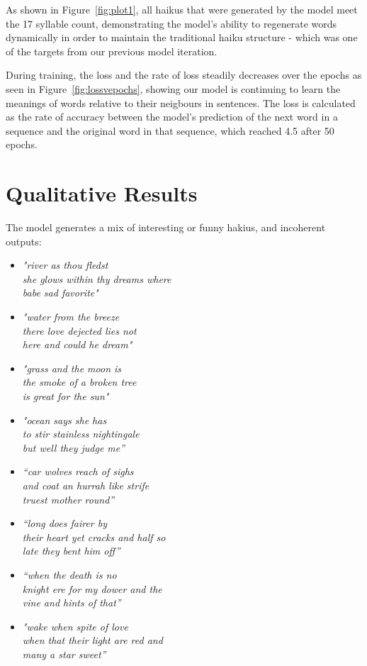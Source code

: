 \documentclass{article} %
\begin{document}
As shown in Figure~\ref{fig:plot1}, all haikus that were generated by the model meet the 17 syllable count, 
demonstrating the model’s ability to regenerate words dynamically in order to maintain the traditional haiku structure - which was one of the targets from our previous model iteration.

During training, the loss and the rate of loss steadily decreases over the epochs as seen in Figure~\ref{fig:lossvepochs}, showing our model is continuing to learn the meanings of words relative to their neigbours in sentences. 
The loss is calculated as the rate of accuracy between the model's prediction of the next word in a sequence and the original word in that sequence, which reached 4.5 after 50 epochs.

\section{Qualitative Results}
The model generates a mix of interesting or funny hakius, and incoherent outputs:
\begin{itemize}


  \item \textit{"river as thou fledst \\
  she glows within thy dreams where \\
  babe sad favorite"}

  \item \textit{"water from the breeze \\
  there love dejected lies not \\
  here and could he dream"}

  \item \textit{"grass and the moon is \\
  the smoke of a broken tree \\
  is great for the sun"}

  \item \textit{"ocean says she has \\
  to stir stainless nightingale \\
  but well they judge me”}

  \item \textit{“car wolves reach of sighs \\
  and coat an hurrah like strife \\
  truest mother round”}

  \item \textit{“long does fairer by \\
  their heart yet cracks and half so \\
  late they bent him off”}

  \item \textit{“when the death is no \\
  knight ere for my dower and the \\
  vine and hints of that”}

  \item \textit{"wake when spite of love \\
  when that their light are red and \\
  many a star sweet”}

\end{itemize}
\end{document}
